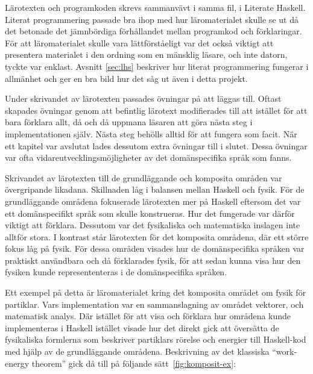 \begin{draft}

Lärotexten och programkoden skrevs sammanvävt i samma fil, i Literate
Haskell. Literat programmering passade bra ihop med
hur läromaterialet skulle se ut då det betonade det jämnbördiga förhållandet
mellan programkod och förklaringar. För att läromaterialet skulle vara
lättförståeligt var det också viktigt att presentera materialet i den ordning
som en mänsklig läsare, och inte datorn, tyckte var enklast. Avsnitt
\ref{sec:lhs} beskriver hur literat programmering fungerar i allmänhet och ger
en bra bild hur det såg ut även i detta projekt.

Under skrivandet av lärotexten passades övningar på att läggas till. Oftast
skapades övningar genom att befintlig lärotext modifierades till att istället
för att bara förklara allt, då och då uppmana läsaren att göra nästa steg i
implementationen själv. Nästa steg behölls alltid för att fungera som facit. När
ett kapitel var avslutat lades dessutom extra övningar till i slutet. Dessa
övningar var ofta vidareutvecklingsmöjligheter av det domänspecifika språk som
fanns.

Skrivandet av lärotexten till de grundläggande och komposita områden var
övergripande likadana. Skillnaden låg i balansen mellan Haskell och fysik. För
de grundläggande områdena fokuserade lärotexten mer på Haskell eftersom det var
ett domänspecifikt språk som skulle konstrueras. Hur det fungerade var därför
viktigt att förklara. Dessutom var det fysikaliska och matematiska inslagen inte
alltför stora. I kontrast står lärotexten för det komposita områdena, där ett
större fokus låg på fysik. För dessa områden visades hur de domänspecifika
språken var praktiskt användbara och då förklarades fysik, för att sedan kunna
visa hur den fysiken kunde represententeras i de domänspecifika språken.

Ett exempel på detta är läromaterialet kring det komposita området om fysik för
partiklar. Vars implementation var en sammanslagning av området vektorer, och
matematisk analys. Där istället för att visa och förklara hur områdena kunde
implementeras i Haskell istället visade hur det direkt gick att översätta de
fysikaliska formlerna som beskriver partiklars rörelse och energier till
Haskell-kod med hjälp av de grundläggande områdena. Beskrivning av det klassiska
``work-energy theorem'' gick då till på följande sätt~\ref{fig:komposit-ex}:


\end{draft}
